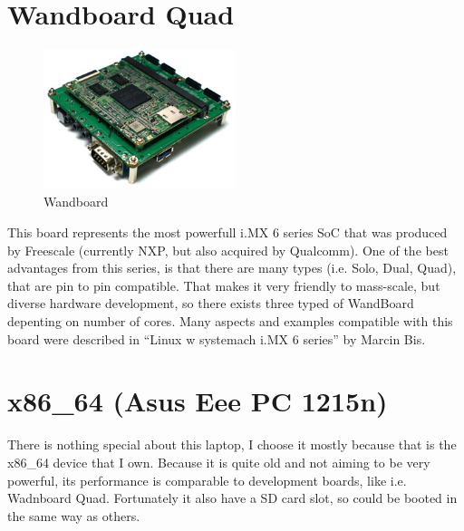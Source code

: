 \documentclass[printmode]{mgr}
\begin{document}
\section{Wandboard Quad}

\begin{figure}[htbp]
  \centering
    \includegraphics[width=0.5\textwidth]{wandboard-front.jpg}
  \caption{Wandboard}
  \label{fig:devboard-wandboard}
\end{figure}

This board represents the most powerfull i.MX 6 series SoC that was produced by Freescale (currently NXP, but also acquired by Qualcomm).
One of the best advantages from this series, is that there are many types (i.e. Solo, Dual, Quad), that are pin to pin compatible.
That makes it very friendly to mass-scale, but diverse hardware development, so there exists three typed of WandBoard depenting on number of cores.
Many aspects and examples compatible with this board were described in ``Linux w systemach i.MX 6 series'' by Marcin Bis.\cite{book:lws-imx6}


\section{x86\_64 (Asus Eee PC 1215n)}

There is nothing special about this laptop, I choose it mostly because that is the x86\_64 device that I own. Because it is quite old and not aiming to be very powerful, its performance is comparable to development boards, like i.e. Wadnboard Quad. Fortunately it also have a SD card slot, so could be booted in the same way as others.
\end{document}
